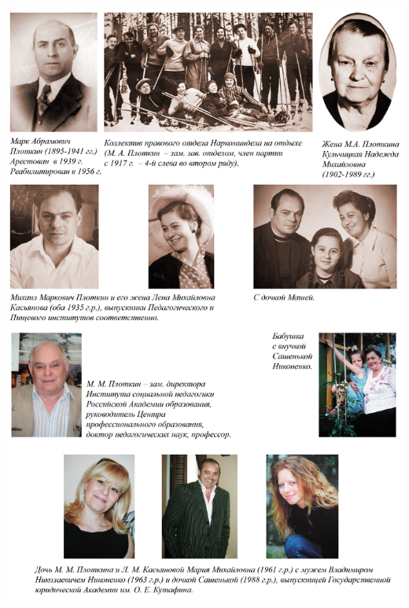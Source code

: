 \begin{center}
\noindent
\includegraphics[height=\paperheight]{inc/plotkiny}

\end{center}

\restoregeometry

